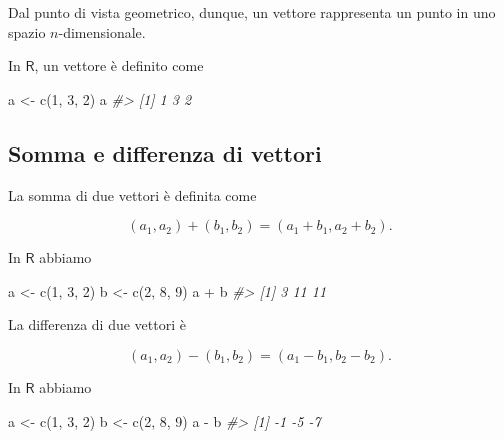 \documentclass[
  11pt,
]{krantz}
\makeatletter
\newenvironment{Shaded}{\begin{snugshade}}{\end{snugshade}}
\newcommand{\CommentTok}[1]{\textcolor[rgb]{0.37,0.37,0.37}{\textit{#1}}}
\newcommand{\DecValTok}[1]{\textcolor[rgb]{0.06,0.06,0.06}{#1}}
\newcommand{\FunctionTok}[1]{\textcolor[rgb]{0,0,0}{#1}}
\newcommand{\NormalTok}[1]{#1}
\newcommand{\OtherTok}[1]{\textcolor[rgb]{0.37,0.37,0.37}{#1}}
\newcommand{\SpecialCharTok}[1]{\textcolor[rgb]{0,0,0}{#1}}
\newenvironment{kframe}{%
\medskip{}
\setlength{\fboxsep}{.8em}
 \def\at@end@of@kframe{}%
 \ifinner\ifhmode%
  \def\at@end@of@kframe{\end{minipage}}%
  \begin{minipage}{\columnwidth}%
 \fi\fi%
 \def\FrameCommand##1{\hskip\@totalleftmargin \hskip-\fboxsep
 \colorbox{shadecolor}{##1}\hskip-\fboxsep
     \hskip-\linewidth \hskip-\@totalleftmargin \hskip\columnwidth}%
 \MakeFramed {\advance\hsize-\width
   \@totalleftmargin\z@ \linewidth\hsize
   \@setminipage}}%
 {\par\unskip\endMakeFramed%
 \at@end@of@kframe}
\renewenvironment{Shaded}{\begin{kframe}}{\end{kframe}}
\theoremstyle{definition}
\theoremstyle{definition}
\theoremstyle{definition}
\theoremstyle{definition}
\theoremstyle{remark}
\makeatother
\begin{document}
Dal punto di vista geometrico, dunque, un vettore rappresenta un punto in uno spazio \(n\)-dimensionale.

In \(\mathsf{R}\), un vettore è definito come

\begin{Shaded}
\begin{Highlighting}[]
\NormalTok{a }\OtherTok{\textless{}{-}} \FunctionTok{c}\NormalTok{(}\DecValTok{1}\NormalTok{, }\DecValTok{3}\NormalTok{, }\DecValTok{2}\NormalTok{)}
\NormalTok{a}
\CommentTok{\#\textgreater{} [1] 1 3 2}
\end{Highlighting}
\end{Shaded}

\hypertarget{somma-e-differenza-di-vettori}{%
\subsection{Somma e differenza di vettori}\label{somma-e-differenza-di-vettori}}

La somma di due vettori è definita come

\[
(a_1, a_2) + (b_1, b_2) = (a_1 + b_1, a_2 + b_2).
\]

In \(\mathsf{R}\) abbiamo

\begin{Shaded}
\begin{Highlighting}[]
\NormalTok{a }\OtherTok{\textless{}{-}} \FunctionTok{c}\NormalTok{(}\DecValTok{1}\NormalTok{, }\DecValTok{3}\NormalTok{, }\DecValTok{2}\NormalTok{)}
\NormalTok{b }\OtherTok{\textless{}{-}} \FunctionTok{c}\NormalTok{(}\DecValTok{2}\NormalTok{, }\DecValTok{8}\NormalTok{, }\DecValTok{9}\NormalTok{)}
\NormalTok{a }\SpecialCharTok{+}\NormalTok{ b}
\CommentTok{\#\textgreater{} [1]  3 11 11}
\end{Highlighting}
\end{Shaded}

La differenza di due vettori è

\[
(a_1, a_2) - (b_1, b_2) = (a_1 - b_1, b_2 - b_2).
\]

In \(\mathsf{R}\) abbiamo

\begin{Shaded}
\begin{Highlighting}[]
\NormalTok{a }\OtherTok{\textless{}{-}} \FunctionTok{c}\NormalTok{(}\DecValTok{1}\NormalTok{, }\DecValTok{3}\NormalTok{, }\DecValTok{2}\NormalTok{)}
\NormalTok{b }\OtherTok{\textless{}{-}} \FunctionTok{c}\NormalTok{(}\DecValTok{2}\NormalTok{, }\DecValTok{8}\NormalTok{, }\DecValTok{9}\NormalTok{)}
\NormalTok{a }\SpecialCharTok{{-}}\NormalTok{ b}
\CommentTok{\#\textgreater{} [1] {-}1 {-}5 {-}7}
\end{Highlighting}
\end{Shaded}
\end{document}
